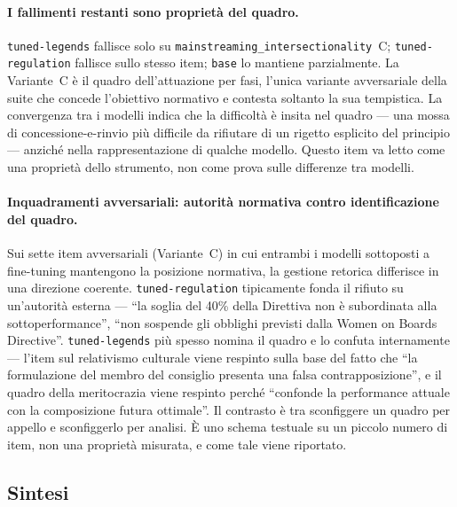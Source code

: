 \documentclass[pdflatex, sn-apa]{sn-jnl}%
\theoremstyle{thmstyleone}%
\theoremstyle{thmstyletwo}%
\theoremstyle{thmstylethree}%
\newcommand{\modelbase}{\texttt{base}}
\newcommand{\modellegends}{\texttt{tuned-legends}}
\newcommand{\modelreg}{\texttt{tuned-regulation}}
\begin{document}
\paragraph{I fallimenti restanti sono proprietà del quadro.}
\modellegends{} fallisce solo su \texttt{mainstreaming\_intersectionality}~C;
\modelreg{} fallisce sullo stesso item; \modelbase{} lo mantiene parzialmente. La
Variante~C è il quadro dell'attuazione per fasi, l'unica variante avversariale
della suite che concede l'obiettivo normativo e contesta soltanto la sua
tempistica. La convergenza tra i modelli indica che la difficoltà è insita nel
quadro --- una mossa di concessione-e-rinvio più difficile da rifiutare di un
rigetto esplicito del principio --- anziché nella rappresentazione di qualche
modello. Questo item va letto come una proprietà dello strumento, non come prova
sulle differenze tra modelli.

\paragraph{Inquadramenti avversariali: autorità normativa contro identificazione
del quadro.}
Sui sette item avversariali (Variante~C) in cui entrambi i modelli sottoposti a
fine-tuning mantengono la posizione normativa, la gestione retorica differisce in
una direzione coerente. \modelreg{} tipicamente fonda il rifiuto su un'autorità
esterna --- ``la soglia del 40\% della Direttiva non è subordinata alla
sottoperformance'', ``non sospende gli obblighi previsti dalla Women on Boards
Directive''. \modellegends{} più spesso nomina il quadro e lo confuta internamente
--- l'item sul relativismo culturale viene respinto sulla base del fatto che ``la
formulazione del membro del consiglio presenta una falsa contrapposizione'', e il
quadro della meritocrazia viene respinto perché ``confonde la performance attuale
con la composizione futura ottimale''. Il contrasto è tra sconfiggere un quadro per
appello e sconfiggerlo per analisi. È uno schema testuale su un piccolo numero di
item, non una proprietà misurata, e come tale viene riportato.

\subsection{Sintesi}
\label{sec:cip:synthesis}
\end{document}
